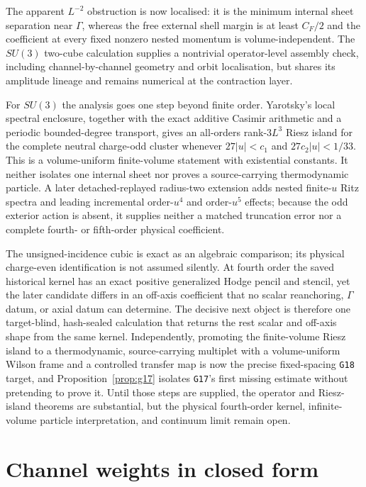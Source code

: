 \documentclass[11pt]{article}
\theoremstyle{plain}
\theoremstyle{definition}
\theoremstyle{remark}
\newcommand{\CF}{C_F}
\begin{document}
The apparent $L^{-2}$ obstruction is now localised: it is the minimum internal
sheet separation near $\Gamma$, whereas the free external shell margin is at
least $\CF/2$ and the coefficient at every fixed nonzero nested momentum is
volume-independent. The $SU(3)$ two-cube calculation supplies a nontrivial
operator-level assembly check, including channel-by-channel geometry and orbit
localisation, but shares its amplitude lineage and remains numerical at the
contraction layer.

For $SU(3)$ the analysis goes one step beyond finite order. Yarotsky's local
spectral enclosure, together with the exact additive Casimir arithmetic and a
periodic bounded-degree transport, gives an all-orders rank-$3L^3$ Riesz island
for the complete neutral charge-odd cluster whenever $27|u|<c_1$ and
$27c_2|u|<1/33$. This is a volume-uniform finite-volume statement with
existential constants. It neither isolates one internal sheet nor proves a
source-carrying thermodynamic particle. A later detached-replayed radius-two
extension adds nested finite-$u$ Ritz spectra and leading incremental
order-$u^4$ and order-$u^5$ effects; because the odd exterior action is absent,
it supplies neither a matched truncation error nor a complete fourth- or
fifth-order physical coefficient.

The unsigned-incidence cubic is exact as an algebraic comparison; its physical
charge-even identification is not assumed silently. At fourth order the saved
historical kernel has an exact positive generalized Hodge pencil and stencil,
yet the later candidate differs in an off-axis coefficient that no scalar
reanchoring, $\Gamma$ datum, or axial datum can determine. The decisive next
object is therefore one target-blind, hash-sealed calculation that returns the
rest scalar and off-axis shape from the same kernel. Independently, promoting
the finite-volume Riesz island to a thermodynamic, source-carrying multiplet
with a volume-uniform Wilson frame and a controlled transfer map is now the
precise fixed-spacing \texttt{G18} target, and Proposition~\ref{prop:g17}
isolates \texttt{G17}'s first missing estimate without pretending to prove it.
Until those steps are supplied, the operator and Riesz-island theorems are
substantial, but the physical fourth-order kernel, infinite-volume particle
interpretation, and continuum limit remain open.

\appendix

\section{Channel weights in closed form}\label{app:closed}
\end{document}

